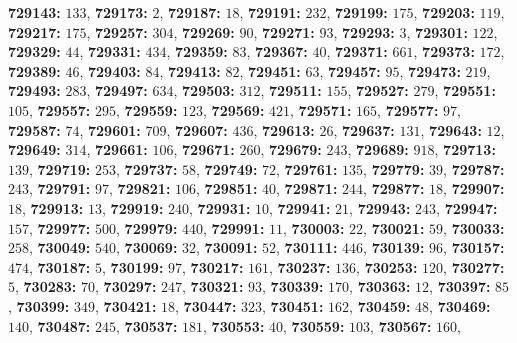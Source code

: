 \textsf{\bfseries 729143:} $133$, \textsf{\bfseries 729173:} $2$, \textsf{\bfseries 729187:} $18$, \textsf{\bfseries 729191:} $232$, \textsf{\bfseries 729199:} $175$, \textsf{\bfseries 729203:} $119$, \textsf{\bfseries 729217:} $175$, \textsf{\bfseries 729257:} $304$, \textsf{\bfseries 729269:} $90$, \textsf{\bfseries 729271:} $93$, \textsf{\bfseries 729293:} $3$, \textsf{\bfseries 729301:} $122$, \textsf{\bfseries 729329:} $44$, \textsf{\bfseries 729331:} $434$, \textsf{\bfseries 729359:} $83$, \textsf{\bfseries 729367:} $40$, \textsf{\bfseries 729371:} $661$, \textsf{\bfseries 729373:} $172$, \textsf{\bfseries 729389:} $46$, \textsf{\bfseries 729403:} $84$, \textsf{\bfseries 729413:} $82$, \textsf{\bfseries 729451:} $63$, \textsf{\bfseries 729457:} $95$, \textsf{\bfseries 729473:} $219$, \textsf{\bfseries 729493:} $283$, \textsf{\bfseries 729497:} $634$, \textsf{\bfseries 729503:} $312$, \textsf{\bfseries 729511:} $155$, \textsf{\bfseries 729527:} $279$, \textsf{\bfseries 729551:} $105$, \textsf{\bfseries 729557:} $295$, \textsf{\bfseries 729559:} $123$, \textsf{\bfseries 729569:} $421$, \textsf{\bfseries 729571:} $165$, \textsf{\bfseries 729577:} $97$, \textsf{\bfseries 729587:} $74$, \textsf{\bfseries 729601:} $709$, \textsf{\bfseries 729607:} $436$, \textsf{\bfseries 729613:} $26$, \textsf{\bfseries 729637:} $131$, \textsf{\bfseries 729643:} $12$, \textsf{\bfseries 729649:} $314$, \textsf{\bfseries 729661:} $106$, \textsf{\bfseries 729671:} $260$, \textsf{\bfseries 729679:} $243$, \textsf{\bfseries 729689:} $918$, \textsf{\bfseries 729713:} $139$, \textsf{\bfseries 729719:} $253$, \textsf{\bfseries 729737:} $58$, \textsf{\bfseries 729749:} $72$, \textsf{\bfseries 729761:} $135$, \textsf{\bfseries 729779:} $39$, \textsf{\bfseries 729787:} $243$, \textsf{\bfseries 729791:} $97$, \textsf{\bfseries 729821:} $106$, \textsf{\bfseries 729851:} $40$, \textsf{\bfseries 729871:} $244$, \textsf{\bfseries 729877:} $18$, \textsf{\bfseries 729907:} $18$, \textsf{\bfseries 729913:} $13$, \textsf{\bfseries 729919:} $240$, \textsf{\bfseries 729931:} $10$, \textsf{\bfseries 729941:} $21$, \textsf{\bfseries 729943:} $243$, \textsf{\bfseries 729947:} $157$, \textsf{\bfseries 729977:} $500$, \textsf{\bfseries 729979:} $440$, \textsf{\bfseries 729991:} $11$, \textsf{\bfseries 730003:} $22$, \textsf{\bfseries 730021:} $59$, \textsf{\bfseries 730033:} $258$, \textsf{\bfseries 730049:} $540$, \textsf{\bfseries 730069:} $32$, \textsf{\bfseries 730091:} $52$, \textsf{\bfseries 730111:} $446$, \textsf{\bfseries 730139:} $96$, \textsf{\bfseries 730157:} $474$, \textsf{\bfseries 730187:} $5$, \textsf{\bfseries 730199:} $97$, \textsf{\bfseries 730217:} $161$, \textsf{\bfseries 730237:} $136$, \textsf{\bfseries 730253:} $120$, \textsf{\bfseries 730277:} $5$, \textsf{\bfseries 730283:} $70$, \textsf{\bfseries 730297:} $247$, \textsf{\bfseries 730321:} $93$, \textsf{\bfseries 730339:} $170$, \textsf{\bfseries 730363:} $12$, \textsf{\bfseries 730397:} $85$, \textsf{\bfseries 730399:} $349$, \textsf{\bfseries 730421:} $18$, \textsf{\bfseries 730447:} $323$, \textsf{\bfseries 730451:} $162$, \textsf{\bfseries 730459:} $48$, \textsf{\bfseries 730469:} $140$, \textsf{\bfseries 730487:} $245$, \textsf{\bfseries 730537:} $181$, \textsf{\bfseries 730553:} $40$, \textsf{\bfseries 730559:} $103$, \textsf{\bfseries 730567:} $160$, 
